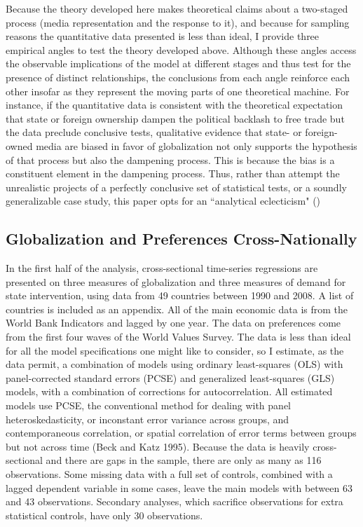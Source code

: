 \documentclass[12pt]{report}
\begin{document}
Because the theory developed here makes theoretical claims about a two-staged process (media
representation and the response to it), and because for sampling reasons the quantitative data
presented is less than ideal, I provide three empirical angles to test the theory developed above.
Although these angles access the observable implications of the model at different stages and thus
test for the presence of distinct relationships, the conclusions from each angle reinforce each
other insofar as they represent the moving parts of one theoretical machine. For instance, if the
quantitative data is consistent with the theoretical expectation that state or foreign ownership
dampen the political backlash to free trade but the data preclude conclusive tests, qualitative
evidence that state- or foreign-owned media are biased in favor of globalization not only supports
the hypothesis of that process but also the dampening process. This is because the bias is a
constituent element in the dampening process. Thus, rather than attempt the unrealistic projects of
a perfectly conclusive set of statistical tests, or a soundly generalizable case study, this paper
opts for an ``analytical eclecticism" (\citealt{Sil:2010jq})

\subsection{Globalization and Preferences Cross-Nationally}

In the first half of the analysis, cross-sectional time-series regressions are presented on three measures of globalization and three measures of demand for state intervention, using data from 49 countries between 1990 and 2008. A list of countries is included as an appendix. All of the main economic data is from the World Bank
Indicators and lagged by one year.  The data on preferences come from the first four waves of the
World Values Survey. The data is less than ideal for all the model specifications one might like to
consider, so I estimate, as the data permit, a combination of models using ordinary least-squares
(OLS) with panel-corrected standard errors (PCSE) and generalized least-squares (GLS) models, with a
combination of corrections for autocorrelation. All estimated models use PCSE, the conventional
method for dealing with panel heteroskedasticity, or inconstant error variance across groups, and
contemporaneous correlation, or spatial correlation of error terms between groups but not across
time (Beck and Katz 1995). Because the data is heavily cross-sectional and there are gaps in the
sample, there are only as many as 116 observations. Some missing data with a full set of controls,
combined with a lagged dependent variable in some cases, leave the main models with between 63 and
43 observations. Secondary analyses, which sacrifice observations for extra statistical controls,
have only 30 observations.
	
\end{document}
